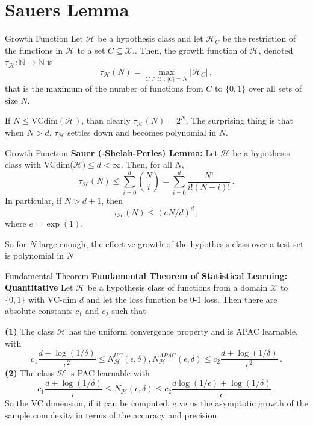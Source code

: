 \documentclass[10pt, table, dvipsnames, handout]{beamer}
\newcommand{\cX}{\ensuremath{\mathcal{X}}}
\newcommand{\cH}{\ensuremath{\mathcal{H}}}
\newcommand{\bN}{\ensuremath{\mathbb{N}}}
\begin{document}
\section{Sauers Lemma}


\begin{frame}[fragile]{Growth Function}
Let $\cH$ be a hypothesis class and let $\cH_{C}$ be the restriction of the functions in $\cH$ to a set $C\subseteq \cX$.. Then, the growth function of $\cH$, denoted $\tau_\cH:\bN\to\bN$ is
$$
\tau_\cH(N) = \max_{C\subset\cX\,:\, |C| = N}|\cH_{C}|\,,
$$
that is the maximum of the number of functions from $C$ to $\{0,1\}$ over all sets of size $N$. 

If $N\leq \text{VCdim}(\cH)$, than clearly $\tau_\cH(N) = 2^N$. The surprising thing is that when $N> d$, $\tau_\cH$ settles down and becomes polynomial in $N$.


\end{frame}




\begin{frame}[fragile]{Growth Function}
\textbf{Sauer (-Shelah-Perles) Lemma:} Let $\cH$ be a hypothesis class with VCdim($\cH)\leq d<\infty$. Then, for all $N$,
$$
\tau_\cH(N)\leq \sum_{i=0}^d\binom{N}{i} = \sum_{i=0}^d \frac{N!}{i!(N-i)!}\,.
$$\pause
In particular, if $N>d+1$, then 
$$
\tau_\cH(N) \leq (eN/d)^d\,,
$$
where $e = \exp(1)$. \pause

So for $N$ large enough, the effective growth of the hypothesis class over a test set is polynomial in $N$ 

\end{frame}






\begin{frame}[fragile]{Fundamental Theorem}
\textbf{Fundamental Theorem of Statistical Learning: Quantitative} Let $\cH$ be a hypothesis class of functions from a domain $\cX$ to $\{0,1\}$ with VC-dim $d$ and let the loss function be 0-1 loss. \pause Then there are absolute constants $c_1$ and $c_2$ such that

\textbf{(1)} The class $\cH$ has the uniform convergence property and is APAC learnable, with
$$
c_1 \frac{d + \log (1/\delta)}{\epsilon^2} \leq N^{UC}_\cH(\epsilon,\delta), N^{APAC}_\cH(\epsilon,\delta) \leq c_2 \frac{d + \log (1/\delta)}{\epsilon^2}\,.
$$\pause
\textbf{(2)} The class $\cH$ is PAC learnable with 
$$
c_1 \frac{d + \log (1/\delta)}{\epsilon} \leq N_\cH(\epsilon,\delta) \leq c_2 \frac{d \log(1/\epsilon)+ \log (1/\delta)}{\epsilon}\,.
$$\pause
So the VC dimension, if it can be computed, give us the asymptotic growth of the sample complexity in terms of the accuracy and precision.
\end{frame}
\end{document}
